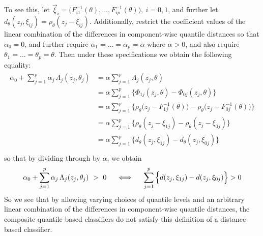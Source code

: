 
To see this, let
$\vec{\xi}_i = \Big(F_{i1}^{-1}(\theta), \dots, F_{ip}^{-1}(\theta) \Big),~ i =
0, 1$, and further let
$d_\theta(z_j, \xi_{ij}) = \rho_{\theta}(z_j - \xi_{ij})$.  Additionally,
restrict the coefficient values of the linear combination of the differences in
component-wise quantile distances so that $\alpha_0 = 0$, and further require
$\alpha_1 = \dots = \alpha_p = \alpha$ where $\alpha > 0$, and also require
$\theta_1 = \dots = \theta_p = \theta$.  Then under these specifications we
obtain the following equality:
\begin{align}
  \label{eq:composite-is-distance}
  \begin{split}
  \alpha_0 + \sum_{j=1}^p \alpha_j \, \Lambda_j (z_j, \theta_j)
  &= \alpha \sum_{j=1}^p \Lambda_j (z_j, \theta) \\[1ex]
  &= \alpha \sum_{j=1}^p \Big\{
  \Phi_{1j} (z_j, \theta) - \Phi_{0j} (z_j, \theta)
  \Big\} \\[1ex]
  &= \alpha \sum_{j=1}^p \Big\{
  \rho_{\theta} \Big(z_j - F_{1j}^{-1}(\theta) \Big) -
  \rho_{\theta} \Big(z_j - F_{0j}^{-1}(\theta) \Big)
  \Big\} \\[1ex]
  &= \alpha \sum_{j=1}^p \Big\{
  \rho_{\theta} (z_j - \xi_{1j} ) -
  \rho_{\theta} (z_j - \xi_{0j} )
  \Big\} \\[1ex]
  &= \alpha \sum_{j=1}^p \Big\{
  d_\theta(z_j, \xi_{1j}) -
  d_\theta(z_j, \xi_{0j})
  \Big\} \\[1ex]
  \end{split}
\end{align}
so that by dividing through by $\alpha$, we obtain
\begin{equation}
  \label{eq:boundary-equivalence}
  \alpha_0 + \sum_{j=1}^p \alpha_j \, \Lambda_j (z_j, \theta_j) ~>~ 0
  \hspace{5mm} \Longleftrightarrow \hspace{5mm}
  \sum_{j=1}^p \Big\{ d(z_j, \xi_{1j}) - d(z_j, \xi_{0j}) \Big\} > 0
\end{equation}
So we see that by allowing varying choices of quantile levels and an arbitrary
linear combination of the differences in component-wise quantile distances, the
composite quantile-based classifiers do not satisfy this definition of a
distance-based classifier.




